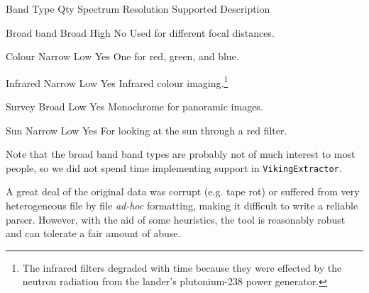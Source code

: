 {
    \bTABLE[split=repeat,option=stretch]
    \setupTABLE[column][6]
        [width=.50\textwidth,
        align=yes]
    \setupTABLE[row][each][align=center]
    \setupTABLE[4][1][align=center]

\bTABLEhead
    \bTR[bottomframe=on]
      \bTH  Band Type \eTH
      \bTH  Qty \eTH
      \bTH  Spectrum \eTH
      \bTH  Resolution \eTH
      \bTH  Supported \eTH
      \bTH  Description \eTH
    \eTR
\eTABLEhead

\bTABLEbody
    \bTR
      \bTC Broad band \eTC
       \eTC
      \bTC Broad \eTC
      \bTC High \eTC
      \bTC No \eTC
      \bTC Used for different focal distances. \eTC
    \eTR

    \bTR
      \bTC Colour \eTC
       \eTC
      \bTC Narrow \eTC
      \bTC Low \eTC
      \bTC Yes \eTC
      \bTC One for red, green, and blue. \eTC
    \eTR

    \bTR
      \bTC Infrared \eTC
       \eTC
      \bTC Narrow \eTC
      \bTC Low \eTC
      \bTC Yes \eTC
      \bTC Infrared colour imaging.\footnote{The infrared filters degraded with time because they were effected by the neutron radiation from the lander's plutonium-238 power generator.} \eTC
    \eTR

    \bTR
      \bTC Survey \eTC
       \eTC
      \bTC Broad \eTC
      \bTC Low \eTC
      \bTC Yes \eTC
      \bTC Monochrome for panoramic images. \eTC
    \eTR
    
    \bTR
      \bTC Sun \eTC
       \eTC
      \bTC Narrow \eTC
      \bTC Low \eTC
      \bTC Yes \eTC
      \bTC For looking at the sun through a red filter. \eTC
    \eTR

\eTABLEbody

\eTABLE
}

Note that the broad band band types are probably not of much interest to most people, so we did not spend time implementing support in {\tt VikingExtractor}.

A great deal of the original data was corrupt (e.g. tape rot) or suffered from very heterogeneous file by file {\it ad-hoc} formatting, making it difficult to write a reliable parser. However, with the aid of some heuristics, the tool is reasonably robust and can tolerate a fair amount of abuse.

